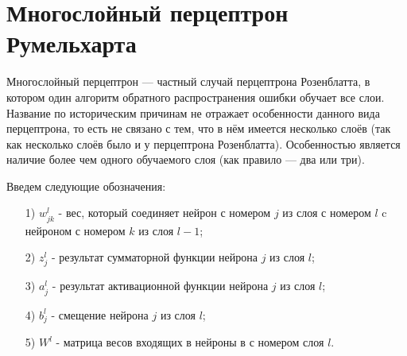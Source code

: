 \section{Многослойный перцептрон Румельхарта}

\indent \indent Многослойный перцептрон — частный случай перцептрона Розенблатта, в котором один алгоритм обратного распространения ошибки обучает все слои. Название по историческим причинам не отражает особенности данного вида перцептрона, то есть не связано с тем, что в нём имеется несколько слоёв (так как несколько слоёв было и у перцептрона Розенблатта). Особенностью является наличие более чем одного обучаемого слоя (как правило — два или три). 

Введем следующие обозначения:
\begin{enumerate}
  \item[1)] $w_{jk}^l$ - вес, который соединяет нейрон с номером $j$ из слоя с номером $l$ c нейроном с номером $k$ из слоя $l-1$;
  \item[2)] $z_j^l$ - результат сумматорной функции нейрона $j$ из слоя $l$;
  \item[3)] $a_j^l$ - результат активационной функции нейрона $j$ из слоя $l$;
  \item[4)] $b_j^l$ - смещение нейрона $j$ из слоя $l$;
  \item[5)] $W^l$ - матрица весов входящих в нейроны в с номером слоя $l$.
\end{enumerate}







